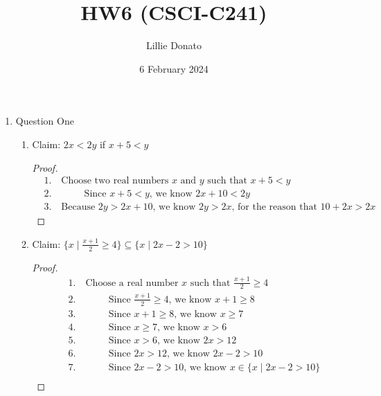 \documentclass{article}
\title{HW6 (CSCI-C241)}
\author{Lillie Donato}
\date{6 February 2024}
\begin{document}
\maketitle

\begin{enumerate}
    \item Question One
    \begin{enumerate}
        \item Claim: $2x < 2y$ if $x + 5 < y$
        \begin{proof}
            \begin{align*}
                &1. \quad \text{Choose two real numbers } x \text{ and } y \text{ such that } x + 5 < y \\
                &2. \hspace{1cm} \quad \text{Since } x+5 < y \text{, we know } 2x + 10 < 2y \\
                &3. \quad \text{Because } 2y > 2x + 10 \text{, we know } 2y > 2x \text{, for the reason that } 10 + 2x > 2x
            \end{align*}
        \end{proof}
        \item Claim: $\{x \mid \frac{x+1}{2} \geq 4\} \subseteq \{x \mid 2x - 2 > 10\}$
        \begin{proof}
            \begin{align*}
                &1. \quad \text{Choose a real number } x \text{ such that } \frac{x+1}{2} \geq 4 \\
                &2. \quad \hspace{1cm} \text{Since } \frac{x+1}{2} \geq 4 \text{, we know } x+1 \geq 8 \\
                &3. \quad \hspace{1cm} \text{Since } x+1 \geq 8 \text{, we know } x \geq 7 \\
                &4. \quad \hspace{1cm} \text{Since } x \geq 7 \text{, we know } x > 6 \\
                &5. \quad \hspace{1cm} \text{Since } x > 6 \text{, we know } 2x > 12 \\
                &6. \quad \hspace{1cm} \text{Since } 2x > 12 \text{, we know } 2x - 2 > 10 \\
                &7. \quad \hspace{1cm} \text{Since } 2x - 2 > 10 \text{, we know } x \in \{x \mid 2x - 2 > 10\} \\

\end{align*}
\end{proof}
\end{enumerate}
\end{enumerate}
\end{document}
